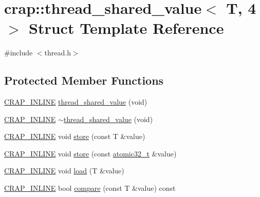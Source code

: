 \hypertarget{structcrap_1_1thread__shared__value_3_01_t_00_014_01_4}{\section{crap\+:\+:thread\+\_\+shared\+\_\+value$<$ T, 4 $>$ Struct Template Reference}
\label{structcrap_1_1thread__shared__value_3_01_t_00_014_01_4}
}


{\ttfamily \#include $<$thread.\+h$>$}

\subsection*{Protected Member Functions}
\begin{DoxyCompactItemize}
\item 
\hyperlink{config__x86_8h_a5a40526b8d842e7ff731509998bb0f1c}{C\+R\+A\+P\+\_\+\+I\+N\+L\+I\+N\+E} \hyperlink{structcrap_1_1thread__shared__value_3_01_t_00_014_01_4_af4c96356261c2c377af177c4400db2e8}{thread\+\_\+shared\+\_\+value} (void)
\item 
\hyperlink{config__x86_8h_a5a40526b8d842e7ff731509998bb0f1c}{C\+R\+A\+P\+\_\+\+I\+N\+L\+I\+N\+E} \hyperlink{structcrap_1_1thread__shared__value_3_01_t_00_014_01_4_a6f5161637906e6a5d4c29ee117a1c302}{$\sim$thread\+\_\+shared\+\_\+value} (void)
\item 
\hyperlink{config__x86_8h_a5a40526b8d842e7ff731509998bb0f1c}{C\+R\+A\+P\+\_\+\+I\+N\+L\+I\+N\+E} void \hyperlink{structcrap_1_1thread__shared__value_3_01_t_00_014_01_4_a695bd3bb261fdf335fc5260ba7c6695f}{store} (const T \&value)
\item 
\hyperlink{config__x86_8h_a5a40526b8d842e7ff731509998bb0f1c}{C\+R\+A\+P\+\_\+\+I\+N\+L\+I\+N\+E} void \hyperlink{structcrap_1_1thread__shared__value_3_01_t_00_014_01_4_adbc165b05d43ea6eddc272e55491e1a4}{store} (const \hyperlink{structcrap_1_1atomic32__t}{atomic32\+\_\+t} \&value)
\item 
\hyperlink{config__x86_8h_a5a40526b8d842e7ff731509998bb0f1c}{C\+R\+A\+P\+\_\+\+I\+N\+L\+I\+N\+E} void \hyperlink{structcrap_1_1thread__shared__value_3_01_t_00_014_01_4_a141964578d0c9ba42376a35a2aa64793}{load} (T \&value)
\item 
\hyperlink{config__x86_8h_a5a40526b8d842e7ff731509998bb0f1c}{C\+R\+A\+P\+\_\+\+I\+N\+L\+I\+N\+E} bool \hyperlink{structcrap_1_1thread__shared__value_3_01_t_00_014_01_4_a675037f891752dacab0b4137efc39728}{compare} (const T \&value) const 

\end{DoxyCompactItemize}
